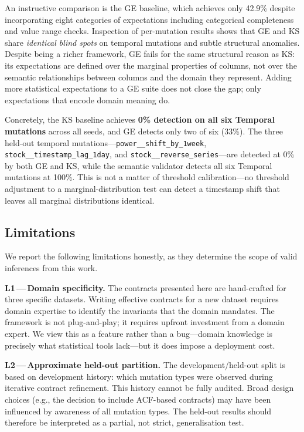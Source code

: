 \documentclass[journal]{IEEEtran}
\newcommand{\mut}[1]{\mbox{\texttt{#1}}}
\begin{document}
An instructive comparison is the GE baseline, which achieves only 42.9\%
despite incorporating eight categories of expectations including categorical
completeness and value range checks.  Inspection of per-mutation results
shows that GE and KS share \emph{identical blind spots} on temporal
mutations and subtle structural anomalies.  Despite being a richer
framework, GE fails for the same structural reason as KS: its expectations
are defined over the marginal properties of columns, not over the
semantic relationships between columns and the domain they represent.
Adding more statistical expectations to a GE suite does not close the
gap; only expectations that encode domain meaning do.

Concretely, the KS baseline achieves \textbf{0\% detection on all six
Temporal mutations} across all seeds, and GE detects only two of six
(33\%).  The three held-out temporal mutations---\mut{power\_\_shift\_by\_1week},
\mut{stock\_\_timestamp\_lag\_1day}, and \mut{stock\_\_reverse\_series}---are
detected at 0\% by both GE and KS, while the semantic validator detects
all six Temporal mutations at 100\%.  This is not a
matter of threshold calibration---no threshold adjustment to a
marginal-distribution test can detect a timestamp shift that leaves all
marginal distributions identical.

\subsection{Limitations}

We report the following limitations honestly, as they determine the scope
of valid inferences from this work.

\textbf{L1\,---\,Domain specificity.}  The contracts presented here are
hand-crafted for three specific datasets.  Writing effective contracts for a
new dataset requires domain expertise to identify the invariants that the
domain mandates.  The framework is not plug-and-play; it requires upfront
investment from a domain expert.  We view this as a feature rather than a
bug---domain knowledge is precisely what statistical tools lack---but it
does impose a deployment cost.

\textbf{L2\,---\,Approximate held-out partition.}  The development/held-out
split is based on development history: which mutation types were observed
during iterative contract refinement.  This history cannot be fully audited.
Broad design choices (e.g., the decision to include ACF-based contracts) may
have been influenced by awareness of all mutation types.  The held-out
results should therefore be interpreted as a partial, not strict,
generalisation test.
\end{document}
